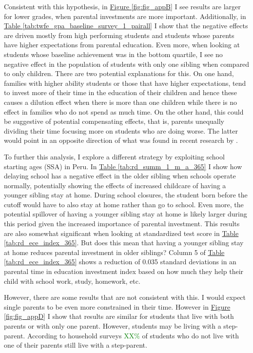 Consistent with this hypothesis, in \hyperref[fig:fig_appB]{Figure \ref{fig:fig_appB}} I see results are larger for lower grades, when parental investments are more important. Additionally, in \hyperref[tab:twfe_gpa_baseline_survey_1_pairall]{Table \ref{tab:twfe_gpa_baseline_survey_1_pairall}} I show that the negative effects are driven mostly from high performing students and students whose parents have higher expectations from parental education. Even more, when looking at students whose baseline achievement was in the bottom quartile, I see no negative effect in the population of students with only one sibling when compared to only children. There are two potential explanations for this. On one hand, families with higher ability students or those that have higher expectations, tend to invest more of their time in the education of their children and hence these causes a dilution effect when there is more than one children while there is no effect in families who do not spend as much time. On the other hand, this could be suggestive of potential compensating effects, that is, parents  unequally dividing their time focusing more on students who are doing worse. The latter would point in an opposite direction of what was found in recent research by \cite{giannola_parental_2024}.

To further this analysis, I explore a different strategy by exploiting school starting ages (SSA) in Peru. In \hyperref[tab:rd_summ_1_m_a_365]{Table \ref{tab:rd_summ_1_m_a_365}} I show how delaying school has a negative effect in the older sibling when schools operate normally, potentially showing the effects of increased childcare of having a younger sibling stay at home. During school closures, the student born before the cutoff would have to also stay at home rather than go to school. Even more, the potential spillover of having a younger sibling stay at home is likely larger during this period given the increased importance of parental investment. This results are also somewhat significant when looking at standardized test score in \hyperref[tab:rd_ece_index_365]{Table \ref{tab:rd_ece_index_365}}. But does this mean that having a younger sibling stay at home reduces parental investment in older siblings? Column 5 of \hyperref[tab:rd_ece_index_365]{Table \ref{tab:rd_ece_index_365}} shows a reduction of 0.035 standard deviations in an parental time in education investment index based on how much they help their child with school work, study, homework, etc.

However, there are some results that are not consistent with this. I would expect single parents to be even more constrained in their time. However in \hyperref[fig:fig_appD]{Figure \ref{fig:fig_appD}} I show that results are similar for students that live with both parents or with only one parent. However, students may be living with a step-parent. According to household surveys \textcolor{green}{XX\%} of students who do not live with one of their parents still live with a step-parent.

